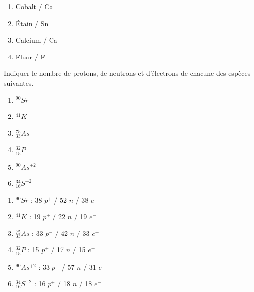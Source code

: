 \documentclass[
  11pt,
  a4paper,
  openany]{book}
\providecommand{\tightlist}{%
  \setlength{\itemsep}{0pt}\setlength{\parskip}{0pt}}
\begin{document}
\begin{Answer}

\begin{enumerate}
\def\labelenumi{\arabic{enumi}.}
\tightlist
\item
  Cobalt / Co
\item
  Étain / Sn
\item
  Calcium / Ca
\item
  Fluor / F
\end{enumerate}

\end{Answer}

\begin{Exercise}

Indiquer le nombre de protons, de neutrons et d'électrons de chacune des espèces suivantes.

\begin{enumerate}
\def\labelenumi{\arabic{enumi}.}
\tightlist
\item
  \(^{90}Sr\)\\
\item
  \(^{41}K\)\\
\item
  \(^{75}_{33}As\)\\
\item
  \(^{32}_{15}P\)\\
\item
  \(^{90}As^{+2}\)\\
\item
  \(^{34}_{16}S^{-2}\)
\end{enumerate}

\end{Exercise}

\begin{Answer}

\begin{enumerate}
\def\labelenumi{\arabic{enumi}.}
\tightlist
\item
  \(^{90}Sr\) : 38 \(p^+\) / 52 \(n\) / 38 \(e^-\)
\item
  \(^{41}K\) : 19 \(p^+\) / 22 \(n\) / 19 \(e^-\)
\item
  \(^{75}_{33}As\) : 33 \(p^+\) / 42 \(n\) / 33 \(e^-\)
\item
  \(^{32}_{15}P\) : 15 \(p^+\) / 17 \(n\) / 15 \(e^-\)
\item
  \(^{90}As^{+2}\) : 33 \(p^+\) / 57 \(n\) / 31 \(e^-\)
\item
  \(^{34}_{16}S^{-2}\) : 16 \(p^+\) / 18 \(n\) / 18 \(e^-\)
\end{enumerate}

\end{Answer}
\end{document}
